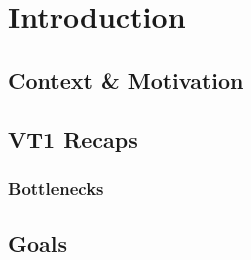 \newpage
\section{Introduction}

\subsection{Context \& Motivation}

\subsection{VT1 Recaps}

\subsubsection{Bottlenecks}

\subsection{Goals}

\newpage
